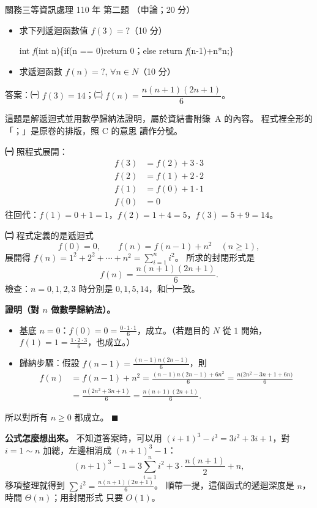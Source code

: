 \begin{pastexam}[label={px:gw3-110-ds-02}]{關務三等資訊處理 110 年 第二題}
（申論；20 分）

\begin{itemize}[leftmargin=2.2em]
\item[㈠] 求下列遞迴函數值 $f(3) = ?$（10 分）

int \textit{f}(int n)\{if(n == 0)return 0；else return \textit{f}(n-1)+n*n;\}
\item[㈡] 求遞迴函數 $f(n) = ?$, $\forall n \in N$（10 分）
\end{itemize}
\end{pastexam}

\begin{pastsoln}
答案：㈠ $f(3) = 14$；㈡ $f(n) = \dfrac{n(n+1)(2n+1)}{6}$。

這題是解遞迴式並用數學歸納法證明，屬於資結書附錄~A 的內容。 程式裡全形的「；」是原卷的排版，照 C 的意思
讀作分號。

\textbf{㈠} 照程式展開：
\begin{align*}
f(3) &= f(2) + 3 \cdot 3 \\
f(2) &= f(1) + 2 \cdot 2 \\
f(1) &= f(0) + 1 \cdot 1 \\
f(0) &= 0
\end{align*}
往回代：$f(1) = 0 + 1 = 1$，$f(2) = 1 + 4 = 5$，$f(3) = 5 + 9 = 14$。

\textbf{㈡} 程式定義的是遞迴式
\[
f(0) = 0,\qquad f(n) = f(n-1) + n^2 \quad (n \ge 1),
\]
展開得 $f(n) = 1^2 + 2^2 + \cdots + n^2 = \sum_{i=1}^{n} i^2$。 所求的封閉形式是
\[
f(n) = \frac{n(n+1)(2n+1)}{6}.
\]
檢查：$n = 0, 1, 2, 3$ 時分別是 $0, 1, 5, 14$，和㈠一致。

\textbf{證明（對 $n$ 做數學歸納法）。}
\begin{itemize}
\item 基底 $n = 0$：$f(0) = 0 = \frac{0 \cdot 1 \cdot 1}{6}$，成立。（若題目的 $N$ 從 $1$ 開始，$f(1) = 1 = \frac{1 \cdot 2 \cdot 3}{6}$，也成立。）
\item 歸納步驟：假設 $f(n-1) = \frac{(n-1)n(2n-1)}{6}$，則
\begin{align*}
f(n) &= f(n-1) + n^2 = \frac{(n-1)n(2n-1) + 6n^2}{6} = \frac{n\bigl(2n^2 - 3n + 1 + 6n\bigr)}{6} \\
     &= \frac{n(2n^2 + 3n + 1)}{6} = \frac{n(n+1)(2n+1)}{6}.
\end{align*}
\end{itemize}
所以對所有 $n \ge 0$ 都成立。
\hfill$\blacksquare$

\textbf{公式怎麼想出來。} 不知道答案時，可以用 $(i+1)^3 - i^3 = 3i^2 + 3i + 1$，對 $i = 1 \sim n$ 加總，左邊相消成
$(n+1)^3 - 1$：
\[
(n+1)^3 - 1 = 3\sum_{i=1}^{n} i^2 + 3 \cdot \frac{n(n+1)}{2} + n,
\]
移項整理就得到 $\sum i^2 = \frac{n(n+1)(2n+1)}{6}$。 順帶一提，這個函式的遞迴深度是 $n$，時間 $\Theta(n)$；用封閉形式
只要 $O(1)$。
\end{pastsoln}
